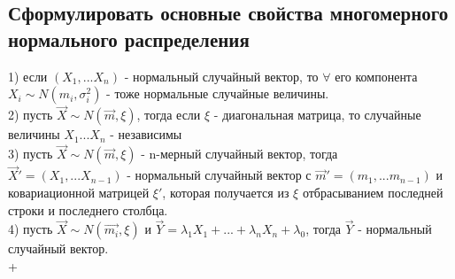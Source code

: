 \subsection{Сформулировать основные свойства многомерного нормального распределения}
1) если $(X_{1}, ... X_{n})$ - нормальный случайный вектор, то $\forall$ его компонента $X_{i} \sim N(m_{i}, \sigma_{i}^{2})$ - тоже нормальные случайные величины.\\
2) пусть $\overrightarrow{X} \sim N(\overrightarrow{m}, \xi)$, тогда если $\xi$ - диагональная матрица, то случайные величины $X_{1} ... X_{n}$ - независимы\\
3) пусть $\overrightarrow{X} \sim N(\overrightarrow{m}, \xi)$ - n-мерный случайный вектор, тогда $\overrightarrow{X}' = (X_{1}, ... X_{n - 1})$ - нормальный случайный вектор с $\overrightarrow{m}' = (m_{1}, ... m_{n - 1})$ и ковариационной матрицей $\xi'$, которая получается из $\xi$ отбрасыванием последней строки и последнего столбца.\\
4) пусть $\overrightarrow{X} \sim N(\overrightarrow{m_{i}}, \xi)$ и $\overrightarrow{Y} = \lambda_{1}X_{1} + ... + \lambda_{n}X_{n} + \lambda_{0}$, тогда $\overrightarrow{Y}$ - нормальный случайный вектор.\\+